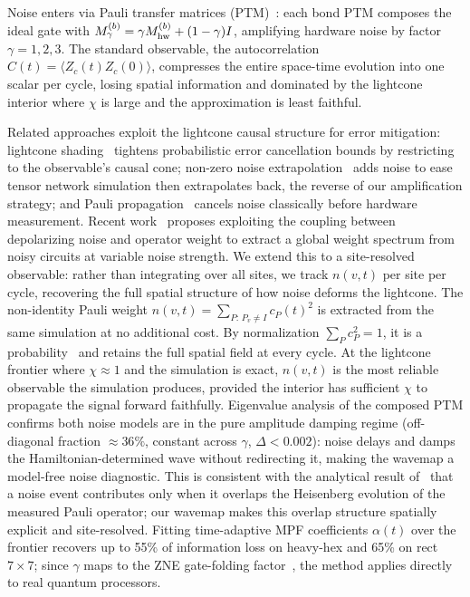 \documentclass[letterpaper]{article}
\begin{document}
Noise enters via Pauli transfer matrices
(PTM)~\cite{rudolph2025simulating}: each bond PTM composes the ideal
gate with $M_\gamma^{(b)} = \gamma M_{\rm hw}^{(b)} + (1-\gamma)I$,
amplifying hardware noise by factor $\gamma=1,2,3$.
The standard observable, the autocorrelation
$C(t)=\langle Z_c(t)Z_c(0)\rangle$, compresses the entire space-time
evolution into one scalar per cycle, losing spatial information and
dominated by the lightcone interior where $\chi$ is large and the
approximation is least faithful.

Related approaches exploit the lightcone causal structure for error
mitigation: lightcone shading~\cite{eddins2024lightconeshading} tightens
probabilistic error cancellation bounds by restricting to the observable's
causal cone; non-zero noise extrapolation~\cite{thompson2025nonzero}
adds noise to ease tensor network simulation then extrapolates back,
the reverse of our amplification strategy; and Pauli
propagation~\cite{eddins2026noisecanceling} cancels noise classically
before hardware measurement.
Recent work~\cite{chang2026noise} proposes exploiting the coupling
between depolarizing noise and operator weight to extract a global
weight spectrum from noisy circuits at variable noise strength.
We extend this to a site-resolved observable: rather than integrating
over all sites, we track $n(v,t)$ per site per cycle, recovering the
full spatial structure of how noise deforms the lightcone.
The non-identity Pauli weight $n(v,t) = \sum_{P:\,P_v\neq I} c_P(t)^2$
is extracted from the same simulation at no additional cost.
By normalization $\sum_P c_P^2=1$, it is a probability~\cite{nahum2018operator}
and retains the full spatial field at every cycle.
At the lightcone frontier where $\chi\approx1$ and the simulation is
exact, $n(v,t)$ is the most reliable observable the simulation
produces, provided the interior has sufficient $\chi$ to propagate
the signal forward faithfully.
Eigenvalue analysis of the composed PTM confirms both noise models are
in the pure amplitude damping regime (off-diagonal fraction $\approx36\%$,
constant across $\gamma$, $\Delta<0.002$): noise delays and damps the
Hamiltonian-determined wave without redirecting it, making the wavemap
a model-free noise diagnostic.
This is consistent with the analytical result of~\cite{yu2026lightconescalingincircuitnoise}
that a noise event contributes only when it overlaps the Heisenberg
evolution of the measured Pauli operator; our wavemap makes this
overlap structure spatially explicit and site-resolved.
Fitting time-adaptive MPF coefficients $\alpha(t)$ over the frontier
recovers up to 55\% of information loss on heavy-hex and 65\% on
rect $7\times7$; since $\gamma$ maps to the ZNE gate-folding
factor~\cite{giurgica2020digital}, the method applies directly to
real quantum processors.
\end{document}

